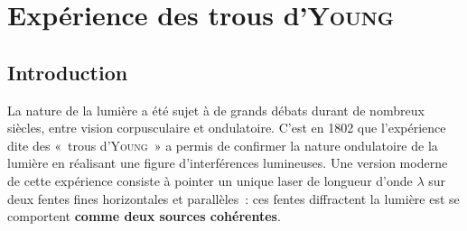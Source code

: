 \documentclass[../../main/main.tex]{subfiles}
\begin{document}
\section{Expérience des trous d'\textsc{Young}}
\subsection{Introduction}

La nature de la lumière a été sujet à de grands débats durant de nombreux
siècles, entre vision corpusculaire et ondulatoire. C'est en 1802 que
l'expérience dite des «~trous d'\textsc{Young}~» a permis de confirmer la nature
ondulatoire de la lumière en réalisant une figure d'interférences
lumineuses. Une version moderne de cette expérience
consiste à pointer un unique laser de longueur d'onde $\lambda$ sur deux fentes
fines horizontales et parallèles~: ces fentes diffractent la lumière est se
comportent \textbf{comme deux sources cohérentes}.

\end{document}

